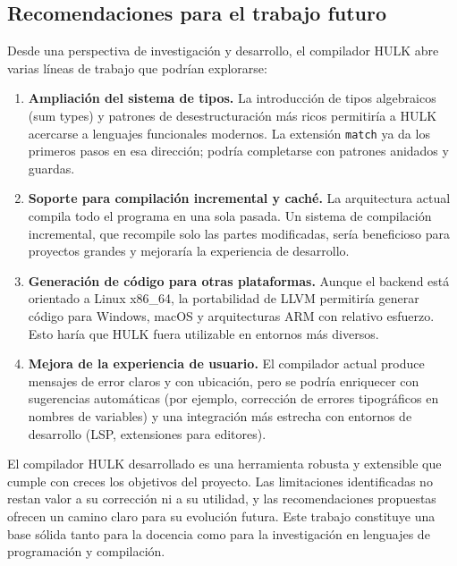 \documentclass[12pt, a4paper]{article}
\begin{document}
\subsection{Recomendaciones para el trabajo futuro}

Desde una perspectiva de investigación y desarrollo, el compilador HULK abre varias líneas de trabajo que podrían explorarse:

\begin{enumerate}[leftmargin=1.4em, itemsep=0.35em]
	\item \textbf{Ampliación del sistema de tipos.} La introducción de tipos algebraicos (sum types) y patrones de desestructuración más ricos permitiría a HULK acercarse a lenguajes funcionales modernos. La extensión \texttt{match} ya da los primeros pasos en esa dirección; podría completarse con patrones anidados y guardas.
	
	\item \textbf{Soporte para compilación incremental y caché.} La arquitectura actual compila todo el programa en una sola pasada. Un sistema de compilación incremental, que recompile solo las partes modificadas, sería beneficioso para proyectos grandes y mejoraría la experiencia de desarrollo.
	
	\item \textbf{Generación de código para otras plataformas.} Aunque el backend está orientado a Linux x86\_64, la portabilidad de LLVM permitiría generar código para Windows, macOS y arquitecturas ARM con relativo esfuerzo. Esto haría que HULK fuera utilizable en entornos más diversos.
	
	\item \textbf{Mejora de la experiencia de usuario.} El compilador actual produce mensajes de error claros y con ubicación, pero se podría enriquecer con sugerencias automáticas (por ejemplo, corrección de errores tipográficos en nombres de variables) y una integración más estrecha con entornos de desarrollo (LSP, extensiones para editores).
\end{enumerate}

El compilador HULK desarrollado es una herramienta robusta y extensible que cumple con creces los objetivos del proyecto. Las limitaciones identificadas no restan valor a su corrección ni a su utilidad, y las recomendaciones propuestas ofrecen un camino claro para su evolución futura. Este trabajo constituye una base sólida tanto para la docencia como para la investigación en lenguajes de programación y compilación.
\end{document}
